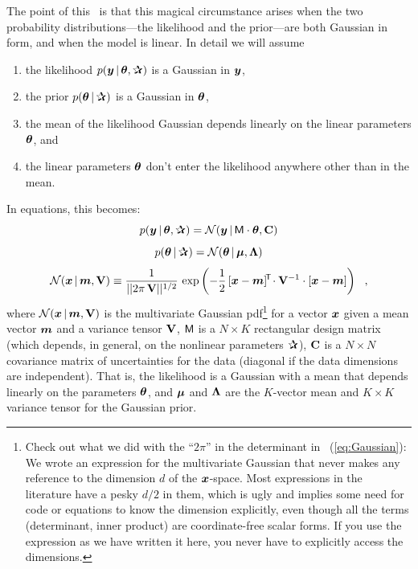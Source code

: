The point of this \documentname\ is that this magical circumstance
arises when the two probability
distributions---the likelihood and the prior---are both Gaussian in
form, and when the model is linear.
In detail we will assume
\begin{enumerate}
\item
the likelihood $p(\vy\given\vtheta,\bP)$ is a Gaussian in $\boldsymbol{y}$,
\item
the prior $p(\vtheta\given\bP)$ is a Gaussian in $\boldsymbol{\theta}$,
\item
the mean of the likelihood Gaussian depends linearly on the linear
parameters $\boldsymbol{\theta}$, and
\item
the linear parameters $\boldsymbol{\theta}$ don't enter the likelihood anywhere
other than in the mean.
\end{enumerate}
In equations, this becomes:
\begin{equation}
p(\vy\given\vtheta,\bP) = \normal(\vy\given\mM\cdot\vtheta,\tC)
\end{equation}
\begin{equation}
p(\vtheta\given\bP) = \normal(\vtheta\given\vmu,\tLambda)
\end{equation}
\begin{equation}\label{eq:Gaussian}
\mathcal{N}\!\,(\boldsymbol{x}\,|\,\boldsymbol{m},\mathbf{V}) \equiv \frac{1}{||2\pi\,\mathbf{V}||^{1/2}}\,\exp\left(-\frac{1}{2}\,[\boldsymbol{x}-\boldsymbol{m}]^{\!\mathsf{T}\!} \cdot \mathbf{V}^{-1} \cdot [\boldsymbol{x} - \boldsymbol{m}]\right)
~~,
\end{equation}
where $\mathcal{N}\!\,(\boldsymbol{x}\,|\,\boldsymbol{m},\mathbf{V})$ is the multivariate Gaussian
pdf\footnote{Check out what we did with the ``$2\pi$'' in the determinant in
  \equationname~(\ref{eq:Gaussian}): We wrote an expression for the
  multivariate Gaussian that never makes any reference to the
  dimension $d$ of the $\boldsymbol{x}$-space. Most expressions in the literature
  have a pesky $d/2$ in them, which is ugly and implies some need for
  code or equations to know the dimension explicitly, even though all
  the terms (determinant, inner product) are coordinate-free scalar
  forms. If you use the expression as we have written it here, you never
  have to explicitly access the dimensions.} for a vector $\boldsymbol{x}$
given a mean vector $\boldsymbol{m}$ and a variance tensor $\mathbf{V}$,
$\mathsf{M}$ is a $N\times K$ rectangular design matrix (which depends, in
general, on the nonlinear parameters $\bP$),
$\mathbf{C}$ is a $N\times N$ covariance matrix of uncertainties for the
data (diagonal if the data dimensions are independent).
That is, the likelihood is a Gaussian with a mean that depends
linearly on the parameters $\boldsymbol{\theta}$, and
$\boldsymbol{\mu}$ and $\mathbf{\Lambda}$ are the $K$-vector mean and $K\times K$ variance tensor
for the Gaussian prior.

